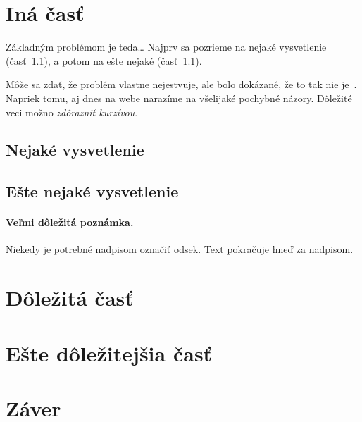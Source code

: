 \documentclass[10pt,twoside,slovak,a4paper]{article}
\begin{document}
\section{Iná časť} \label{ina}

Základným problémom je teda\ldots{} Najprv sa pozrieme na nejaké vysvetlenie (časť~\ref{ina:nejake}), a potom na ešte nejaké (časť~\ref{ina:nejake}).

Môže sa zdať, že problém vlastne nejestvuje\cite{Coplien:MPD}, ale bolo dokázané, že to tak nie je~\cite{Czarnecki:Staged, Czarnecki:Progress}. Napriek tomu, aj dnes na webe narazíme na všelijaké pochybné názory\cite{PLP-Framework}. Dôležité veci možno \emph{zdôrazniť kurzívou}.


\subsection{Nejaké vysvetlenie} \label{ina:nejake}


\subsection{Ešte nejaké vysvetlenie} \label{ina:este}

\paragraph{Veľmi dôležitá poznámka.}
Niekedy je potrebné nadpisom označiť odsek. Text pokračuje hneď za nadpisom.



\section{Dôležitá časť} \label{dolezita}




\section{Ešte dôležitejšia časť} \label{dolezitejsia}




\section{Záver} \label{zaver} %






\end{document}
